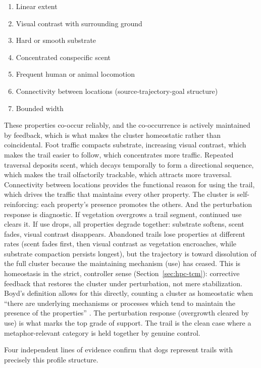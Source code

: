 \documentclass[12pt]{article}
\begin{document}
\begin{enumerate}
\item Linear extent
\item Visual contrast with surrounding ground
\item Hard or smooth substrate
\item Concentrated conspecific scent
\item Frequent human or animal locomotion
\item Connectivity between locations (source-trajectory-goal structure)
\item Bounded width
\end{enumerate}

These properties co-occur reliably, and the co-occurrence is actively maintained by feedback, which is what makes the cluster homeostatic rather than coincidental. Foot traffic compacts substrate, increasing visual contrast, which makes the trail easier to follow, which concentrates more traffic. Repeated traversal deposits scent, which decays temporally to form a directional sequence, which makes the trail olfactorily trackable, which attracts more traversal. Connectivity between locations provides the functional reason for using the trail, which drives the traffic that maintains every other property. The cluster is self-reinforcing: each property's presence promotes the others. And the perturbation response is diagnostic. If vegetation overgrows a trail segment, continued use clears it. If use drops, all properties degrade together: substrate softens, scent fades, visual contrast disappears. Abandoned trails lose properties at different rates (scent fades first, then visual contrast as vegetation encroaches, while substrate compaction persists longest), but the trajectory is toward dissolution of the full cluster because the maintaining mechanism (use) has ceased. This is homeostasis in the strict, controller sense (Section~\ref{sec:hpc-tcm}): corrective feedback that restores the cluster under perturbation, not mere stabilization. Boyd's definition allows for this directly, counting a cluster as homeostatic
when
\enquote{there are underlying mechanisms or processes which tend to maintain the
presence of the properties} \citep[526]{boyd1993metaphor}. The perturbation
response (overgrowth cleared by use) is what marks the top grade of support. The trail is the clean case where a metaphor-relevant category is held together by genuine control.

Four independent lines of evidence confirm that dogs represent trails with precisely this profile structure.
\end{document}
